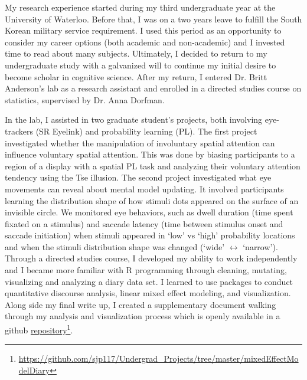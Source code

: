 \documentclass[12pt]{article}
\begin{document}
	My research experience started during my third undergraduate year at the University of Waterloo. Before that, I was on a two years leave to fulfill the South Korean military service requirement. I used this period as an opportunity to consider my career options (both academic and non-academic) and I invested time to read about many subjects. Ultimately, I decided to return to my undergraduate study with a galvanized will to continue my initial desire to become scholar in cognitive science. After my return, I entered Dr. Britt Anderson's lab as a research assistant and enrolled in a directed studies course on statistics, supervised by Dr. Anna Dorfman.
	
	In the lab, I assisted in two graduate student's projects, both involving eye-trackers (SR Eyelink) and probability learning (PL). The first project investigated whether the manipulation of involuntary spatial attention can influence voluntary spatial attention. This was done by biasing participants to a region of a display with a spatial PL task and analyzing their voluntary attention tendency using the Tse illusion. The second project investigated what eye movements can reveal about mental model updating. It involved participants learning the distribution shape of how stimuli dots appeared on the surface of an invisible circle. We monitored eye behaviors, such as dwell duration (time spent fixated on a stimulus) and saccade latency (time between stimulus onset and saccade initiation) when stimuli appeared in `low' vs `high' probability locations and when the stimuli distribution shape was changed (`wide' $\leftrightarrow$ `narrow'). Through a directed studies course, I developed my ability to work independently and I became more familiar with R programming through cleaning, mutating, visualizing and analyzing a diary data set. I learned to use packages to conduct quantitative discourse analysis, linear mixed effect modeling, and visualization. Along side my final write up, I created a supplementary document walking through my analysis and visualization process which is openly available in a github \href{https://github.com/sjp117/Undergrad_Projects/tree/master/mixedEffectModelDiary}{repository}\footnote{\url{https://github.com/sjp117/Undergrad\_Projects/tree/master/mixedEffectModelDiary}}.
	
\end{document}
